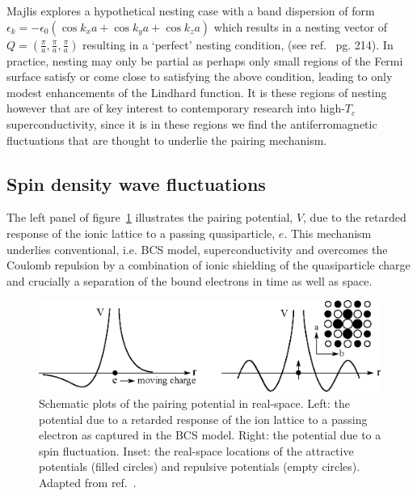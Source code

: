 Majlis explores a hypothetical nesting case with a band dispersion of form $\epsilon_k = -\epsilon_0(\cos k_x a + \cos k_y a + \cos k_z a)$ which results in a nesting vector of $Q=(\frac{\pi}{a}, \frac{\pi}{a}, \frac{\pi}{a})$ resulting in a `perfect' nesting condition, (see ref.~\cite{Majlis2007} pg. 214). In practice, nesting may only be partial as perhaps only small regions of the Fermi surface satisfy or come close to satisfying the above condition, leading to only modest enhancements of the Lindhard function. It is these regions of nesting however that are of key interest to contemporary research into high-$T_c$ superconductivity, since it is in these regions we find the antiferromagnetic fluctuations that are thought to underlie the pairing mechanism.

\subsection{Spin density wave fluctuations}

The left panel of figure~\ref{Fig:Theo:PairingPotential1D} illustrates the pairing potential, $V$,  due to the retarded response of the ionic lattice to a passing quasiparticle, $e$. This mechanism underlies conventional, i.e. \ac{BCS} model, superconductivity and overcomes the Coulomb repulsion by a combination of ionic shielding of the quasiparticle charge and crucially a separation of the bound electrons in time as well as space.
\begin{figure}[htbp]
    \begin{center}
        \includegraphics[scale=0.9]{Chapter-Theory/Figures/PairingPotential1D/PairingPotential1D}
        \caption{Schematic plots of the pairing potential in real-space. Left: the potential due to a retarded response of the ion lattice to a passing electron as captured in the \ac{BCS} model. Right: the potential due to a spin fluctuation. Inset: the real-space locations of the attractive potentials (filled circles) and repulsive potentials (empty circles). Adapted from ref.~\cite{Monthoux2007}.}
        \label{Fig:Theo:PairingPotential1D}
    \end{center}
\end{figure}

